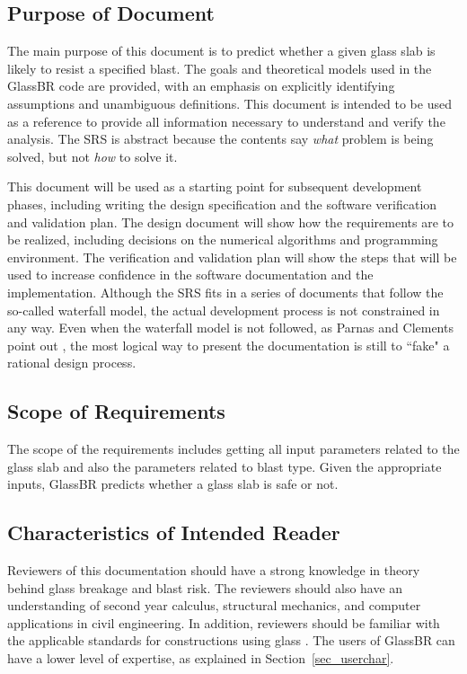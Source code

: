 \documentclass[12pt]{article}
\newcommand{\progname}{GlassBR}
\begin{document}
\subsection{Purpose of Document}

The main purpose of this document is to predict whether a given glass slab is
likely to resist a specified blast.  The goals and theoretical models used in
the \progname{} code are provided, with an emphasis on explicitly identifying
assumptions and unambiguous definitions.  This document is intended to be used
as a reference to provide all information necessary to understand and verify the
analysis.  The SRS is abstract because the contents say \emph{what} problem is
being solved, but not \emph{how} to solve it.

This document will be used as a starting point for subsequent development
phases, including writing the design specification and the software verification
and validation plan.  The design document will show how the requirements are to
be realized, including decisions on the numerical algorithms and programming
environment.  The verification and validation plan will show the steps that will
be used to increase confidence in the software documentation and the
implementation. Although the SRS fits
in a series of documents that follow the so-called waterfall model, the actual development
process is not constrained in any way. Even when the waterfall model is not followed, as
Parnas and Clements point out \cite{ParnasAndClements1986}, the most logical way to present
the documentation is still to ``fake" a rational design process.

\subsection{Scope of Requirements} 

The scope of the requirements includes getting all input parameters related to
the glass slab and also the parameters related to blast type. Given the appropriate inputs,
\progname{} predicts whether a glass slab is safe or not.

\subsection{Characteristics of Intended Reader}
\label{Sec:CharofInteRead}
Reviewers of this documentation should have a strong knowledge in theory behind
glass breakage and blast risk. The reviewers should also have an understanding
of second year calculus, structural mechanics, and computer applications in
civil engineering. In addition, reviewers should be familiar with the applicable
standards for constructions using glass \cite{ASTM2009, ASTM2016,
  ASTM2012a}. The users of \progname{} can have a lower level of expertise, as
explained in Section~\ref{sec_userchar}.
\end{document}
